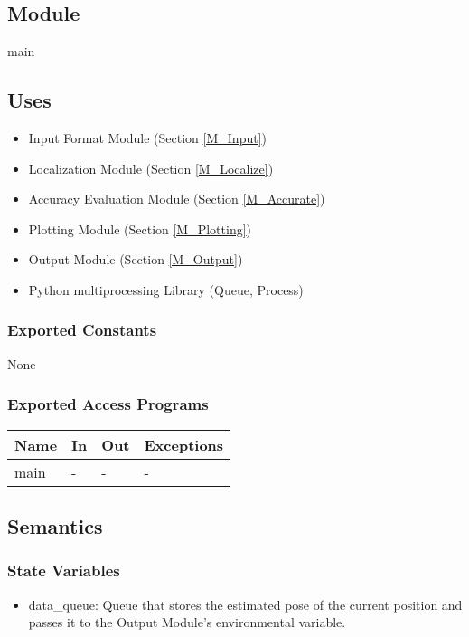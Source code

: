 \documentclass[12pt, titlepage]{article}
\begin{document}

\subsection{Module}

main

\subsection{Uses}
\begin{itemize}
  \item Input Format Module (Section \ref{M_Input})
  \item Localization Module (Section \ref{M_Localize})
  \item Accuracy Evaluation Module (Section \ref{M_Accurate})
  \item Plotting Module (Section \ref{M_Plotting})
  \item Output Module (Section \ref{M_Output})
  \item Python multiprocessing Library (Queue, Process)
\end{itemize}


\subsubsection{Exported Constants}
None

\subsubsection{Exported Access Programs}

\begin{center}
\begin{tabular}{p{2cm} p{4cm} p{4cm} p{2cm}}
\hline
\textbf{Name} & \textbf{In} & \textbf{Out} & \textbf{Exceptions} \\
\hline
main& - & - & - \\
\hline
\end{tabular}
\end{center}

\subsection{Semantics}

\subsubsection{State Variables}
\begin{itemize}
  \item data\_queue: Queue that stores the estimated pose of the current position and passes it to the Output Module's environmental variable.
\end{itemize}
\end{document}
